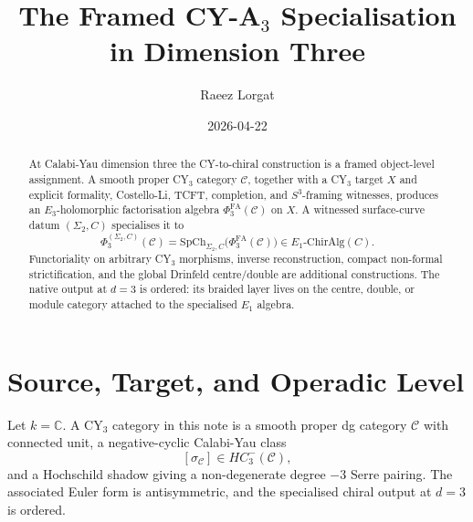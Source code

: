 \documentclass[11pt]{article}
\title{The Framed CY-A$_3$ Specialisation in Dimension Three}
\author{Raeez Lorgat}
\date{2026-04-22}
\begin{document}
\maketitle

\begin{abstract}
At Calabi-Yau dimension three the CY-to-chiral construction is a
framed object-level assignment.  A smooth proper CY$_3$ category
$\mathcal C$, together with a CY$_3$ target $X$ and explicit
formality, Costello-Li, TCFT, completion, and $S^3$-framing witnesses,
produces an $E_3$-holomorphic factorisation algebra
$\Phi^{\mathrm{FA}}_3(\mathcal C)$ on $X$.  A witnessed surface-curve
datum $(\Sigma_2,C)$ specialises it to
\[
  \Phi^{(\Sigma_2,C)}_3(\mathcal C)
  =
  \mathrm{SpCh}_{\Sigma_2,C}\bigl(\Phi^{\mathrm{FA}}_3(\mathcal C)\bigr)
  \in E_1\text{-}\mathrm{ChirAlg}(C).
\]
Functoriality on arbitrary CY$_3$ morphisms, inverse reconstruction,
compact non-formal strictification, and the global Drinfeld
centre/double are additional constructions.  The native output at
$d=3$ is ordered: its braided layer lives on the centre, double, or
module category attached to the specialised $E_1$ algebra.
\end{abstract}

\tableofcontents

\section{Source, Target, and Operadic Level}
\label{sec:source-target}

Let $k=\mathbb C$.  A CY$_3$ category in this note is a smooth proper
dg category $\mathcal C$ with connected unit, a negative-cyclic
Calabi-Yau class
\[
  [\sigma_{\mathcal C}]\in HC^-_3(\mathcal C),
\]
and a Hochschild shadow giving a non-degenerate degree $-3$ Serre
pairing.  The associated Euler form is antisymmetric, and the
specialised chiral output at $d=3$ is ordered.
\end{document}
